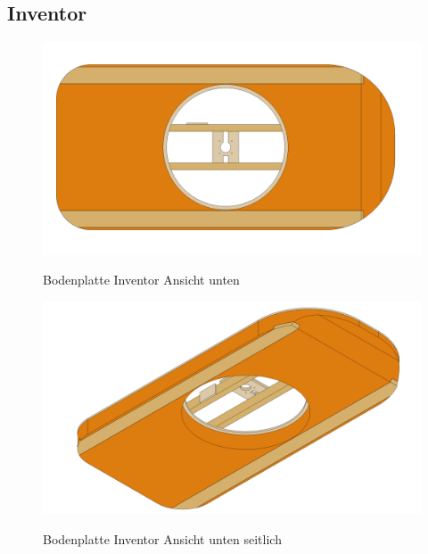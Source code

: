 \clearpage
\subsection{Inventor}
\begin{figure}[H]
    \centering
    \includegraphics[width=.92\textwidth]{../Inventor/Bodenplatte/png/Bodenplatte_unten.png}
    \label{fig:konst:bodenplatte:inventor1}
    \caption{Bodenplatte Inventor Ansicht unten}
\end{figure}
\begin{figure}[H]
    \centering
    \includegraphics[width=.92\textwidth]{../Inventor/Bodenplatte/png/Bodenplatte_seitlich.png}
    \label{fig:konst:bodenplatte:inventor2}
    \caption{Bodenplatte Inventor Ansicht unten seitlich}
\end{figure}

